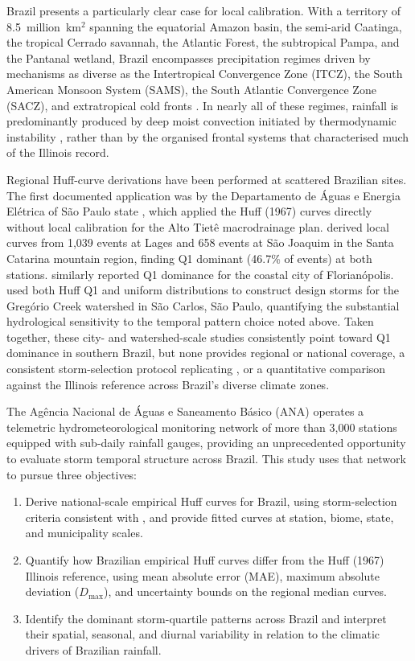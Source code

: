 \documentclass[a4paper,fleqn]{cas-sc}
\begin{document}
Brazil presents a particularly clear case for local calibration.
With a territory of 8.5~million~km$^2$ spanning the equatorial
Amazon basin, the semi-arid Caatinga, the tropical Cerrado savannah,
the Atlantic Forest, the subtropical Pampa, and the Pantanal wetland,
Brazil encompasses precipitation regimes driven by mechanisms as
diverse as the Intertropical Convergence Zone (ITCZ), the South
American Monsoon System (SAMS), the South Atlantic Convergence Zone
(SACZ), and extratropical cold fronts \citep{Marengo2012}. In nearly
all of these regimes, rainfall is predominantly produced by deep moist
convection initiated by thermodynamic instability \citep{Zipser2006},
rather than by the organised frontal systems that characterised much
of the Illinois record.

Regional Huff-curve derivations have been performed at scattered
Brazilian sites. The first documented application was by the
Departamento de Águas e Energia Elétrica of São Paulo state
\citep{DAEE1983}, which applied the Huff (1967) curves directly
without local calibration for the Alto Tietê macrodrainage plan.
\citet{SantaCatarina2021} derived local curves from 1,039 events at
Lages and 658 events at São Joaquim in the Santa Catarina mountain
region, finding Q1 dominant (46.7\% of events) at both stations.
\citet{Florianopolis2021} similarly reported Q1 dominance for the
coastal city of Florianópolis. \citet{Abreu2017} used both Huff Q1
and uniform distributions to construct design storms for the Gregório
Creek watershed in São Carlos, São Paulo, quantifying the substantial
hydrological sensitivity to the temporal pattern choice noted above.
Taken together, these city- and watershed-scale studies consistently
point toward Q1 dominance in southern Brazil, but none provides
regional or national coverage, a consistent storm-selection protocol
replicating \citet{Huff1967}, or a quantitative comparison against
the Illinois reference across Brazil's diverse climate zones.

The Agência Nacional de Águas e Saneamento Básico (ANA) operates a telemetric hydrometeorological monitoring network of more than 3,000 stations equipped with sub-daily rainfall gauges, providing an unprecedented opportunity to evaluate storm temporal structure across Brazil. This study uses that network to pursue three objectives:

\begin{enumerate}
	\item Derive national-scale empirical Huff curves for Brazil, using storm-selection criteria consistent with \citet{Huff1967}, and provide fitted curves at station, biome, state, and municipality scales.
	
	\item Quantify how Brazilian empirical Huff curves differ from the Huff (1967) Illinois reference, using mean absolute error (MAE), maximum absolute deviation ($D_\mathrm{max}$), and uncertainty bounds on the regional median curves.
	
	\item Identify the dominant storm-quartile patterns across Brazil and interpret their spatial, seasonal, and diurnal variability in relation to the climatic drivers of Brazilian rainfall.
\end{enumerate}
\end{document}
